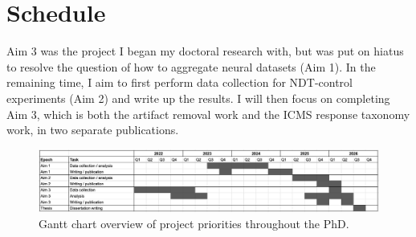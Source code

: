 \documentclass[12pt,oneside]{report}
\begin{document}
\chapter{Schedule}
Aim 3 was the project I began my doctoral research with, but was put on hiatus to resolve the question of how to aggregate neural datasets (Aim 1). In the remaining time, I aim to first perform data collection for NDT-control experiments (Aim 2) and write up the results. I will then focus on completing Aim 3, which is both the artifact removal work and the ICMS response taxonomy work, in two separate publications.

\begin{figure}[h]
  \centering
  \includegraphics[width=1.0\linewidth]{ch5_schedule_gantt.png}
  \caption{Gantt chart overview of project priorities throughout the PhD.}
  \label{fig:schedule}
\end{figure}

\cleardoublepage
\printbibliography
\end{document}

